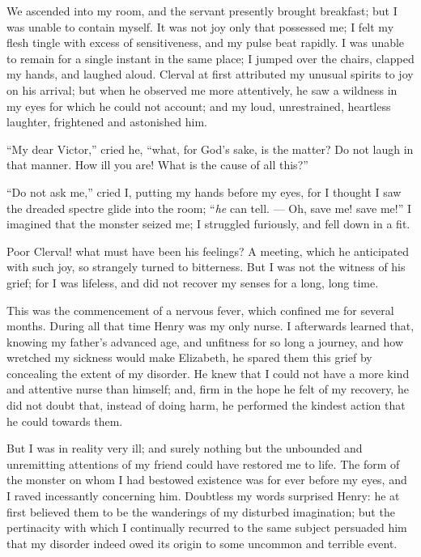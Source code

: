 We ascended into my room, and the
servant pres\-ently brought breakfast;
but I was unable to contain myself.
It was not joy only that possessed me;
I felt my flesh tingle with excess of sensitiveness,
and my pulse beat rapidly.
I was unable to remain for a single instant
in the same place; I jumped over
the chairs, clapped my hands, and
laughed aloud. Clerval at first attributed
my unusual spirits to joy on his
arrival; but when he observed me
more attentively, he saw a wildness in
my eyes for which he could not account;
and my loud, unrestrained, heartless
laughter, frightened and astonished
him.

``My dear Victor,'' cried he, ``what,
for God's sake, is the matter? Do not
laugh in that manner. How ill you are!
What is the cause of all this?''

``Do not ask me,'' cried I, putting
my hands before my eyes, for I thought
I saw the dreaded spectre glide into
the room; ``\emph{he} can tell. --- Oh, save me!
save me!'' I imagined that the monster
seized me; I struggled furiously,
and fell down in a fit.

Poor Clerval! what must have been
his feelings? A meeting, which he anticipated
with such joy, so strangely
turned to bitterness. But I was not
the witness of his grief; for I was lifeless,
and did not recover my senses for
a long, long time.

This was the commencement of a
nervous fever, which confined me for
several months. During all that time
Henry was my only nurse. I afterwards
learned that, knowing my father's
advanced age, and unfitness for so long
a journey, and how wretched my sickness
would make Elizabeth, he spared
them this grief by concealing the extent
of my disorder. He knew that
I could not have a more kind and
attentive nurse than himself; and, firm
in the hope he felt of my recovery, he
did not doubt that, instead of doing
harm, he performed the kindest action
that he could towards them.

But I was in reality very ill; and
surely nothing but the unbounded and
unremitting attentions of my friend
could have restored me to life. The
form of the monster on whom I had
bestowed existence was for ever before
my eyes, and I raved incessantly concerning
him. Doubtless my words surprised
Henry: he at first believed them
to be the wanderings of my disturbed
imagination; but the pertinacity with
which I continually recurred to the
same subject persuaded him that my
disorder indeed owed its origin to some
uncommon and terrible event.

